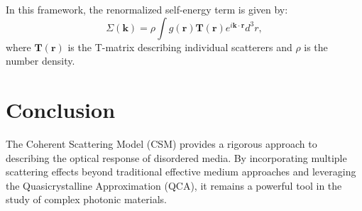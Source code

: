 \documentclass{article}
\begin{document}
	In this framework, the renormalized self-energy term is given by:
	\begin{equation}
		\Sigma(\mathbf{k}) = \rho \int g(\mathbf{r}) \mathbf{T}(\mathbf{r}) e^{i \mathbf{k} \cdot \mathbf{r}} d^3r,
	\end{equation}
	where $\mathbf{T}(\mathbf{r})$ is the T-matrix describing individual scatterers and $\rho$ is the number density.
	
	\section{Conclusion}
	The Coherent Scattering Model (CSM) provides a rigorous approach to describing the optical response of disordered media. By incorporating multiple scattering effects beyond traditional effective medium approaches and leveraging the Quasicrystalline Approximation (QCA), it remains a powerful tool in the study of complex photonic materials.
	
	
	
	
\end{document}
